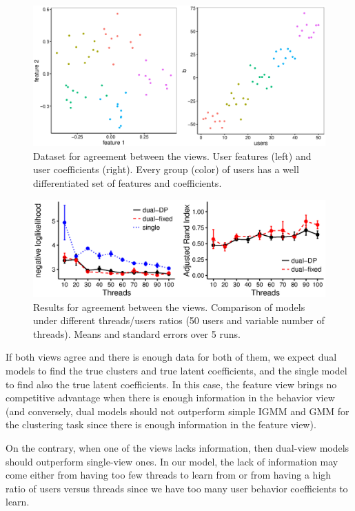 \documentclass[smallextended]{svjour3}          %
\begin{document}
\begin{figure}
	\centering
	\includegraphics[width=1\textwidth]{Fig2_data_agreement}
	\caption{Dataset for agreement between the views. User features (left) and user coefficients (right). Every group (color) of users has a well differentiated set of features and coefficients.}
	\label{fig:data_agreement}
\end{figure}
\begin{figure}
	\centering
	\includegraphics[width=1\textwidth]{Fig3_results_agreement_bw}%
	\caption{Results for agreement between the views. Comparison of models under different threads/users ratios (50 users and variable number of threads). Means and standard errors over 5 runs.}
	\label{fig:results_agreement}
\end{figure}


If both views agree and there is enough data for both of them, we expect dual models to find the true clusters and true latent coefficients, and the single model to find also the true latent coefficients. In this case, the feature view brings no competitive advantage when there is enough information in the behavior view (and conversely, dual models should not outperform simple IGMM and GMM for the clustering task since there is enough information in the feature view).

On the contrary, when one of the views lacks information, then dual-view models should outperform single-view ones. In our model, the lack of information may come either from having too few threads to learn from or from having a high ratio of users versus threads since we have too many user behavior coefficients to learn. 
\end{document}
